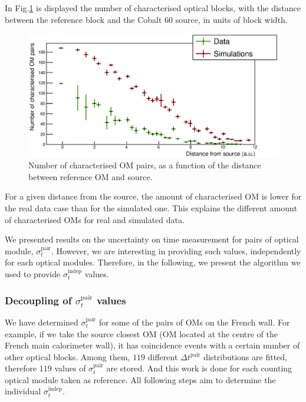 In Fig.\ref{fig:Co_sigma_distance} is displayed the number of characterised optical blocks, with the distance between the reference block and the Cobalt $60$ source, in units of block width.
\begin{figure}[h]
  \centering
  \includegraphics[width=15cm]{commissioning/fig_commissioning/Co_sigma_distance.eps}
  \caption{Number of characterised OM pairs, as a function of the distance between reference OM and source.
    \label{fig:Co_sigma_distance}}
\end{figure}
For a given distance from the source, the amount of characterised OM is lower for the real data case than for the simulated one.
This explains the different amount of characterised OMs for real and simulated data.

We presented results on the uncertainty on time measurement for pairs of optical module, $\sigma_{t}^{\text{pair}}$.
However, we are interesting in providing such values, independently for each optical modules.
Therefore, in the following, we present the algorithm we used to provide $\sigma_{t}^{\text{indep}}$ values.




\subsubsection*{Decoupling of $\sigma_{t}^{\text{pair}}$ values}

We have determined $\sigma_{t}^{\text{pair}}$ for some of the pairs of OMs on the French wall.
For example, if we take the source closest OM (OM located at the centre of the French main calorimeter wall), it has coincidence events with a certain number of other optical blocks.
Among them, $119$ different $\Delta t^{\text{pair}}$ distributions are fitted, therefore $119$ values of $\sigma_{t}^{\text{pair}}$ are stored.
And this work is done for each counting optical module taken as reference.
All following steps aim to determine the individual $\sigma_{t}^{\text{indep}}$.

